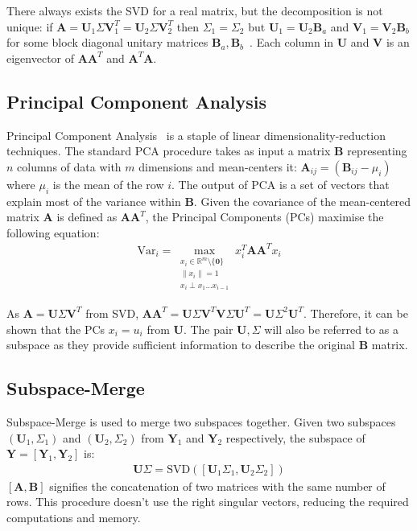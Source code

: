 There always exists the SVD for a real matrix, but the decomposition is not
unique: if $\mathbf{A} = \mathbf{U}_1\Sigma\mathbf{V}_1^T =
\mathbf{U}_2\Sigma\mathbf{V}_2^T$ then $\Sigma_1 = \Sigma_2$ but $\mathbf{U}_1 =
\mathbf{U}_2\mathbf{B}_a$ and $\mathbf{V}_1 = \mathbf{V}_2\mathbf{B}_b$ for some
block diagonal unitary matrices $\mathbf{B}_a,
\mathbf{B}_b$~\cite{eftekhari2019moses, Strang2009}. Each column in
$\mathbf{U}$ and $\mathbf{V}$ is an eigenvector of $\mathbf{AA}^T$ and
$\mathbf{A}^T\mathbf{A}$.

\subsection{Principal Component Analysis}
Principal Component Analysis~\cite{} is a staple of linear
dimensionality-reduction techniques. The standard PCA procedure takes as input a
matrix $\mathbf{B}$ representing $n$ columns of data with $m$ dimensions and
mean-centers it: $\mathbf{A}_{ij} = (\mathbf{B}_{ij} - \mu_i)$ where $\mu_i$ is
the mean of the row $i$. The output of PCA is a set of vectors that explain most
of the variance within $\mathbf{B}$. Given the covariance of the mean-centered
matrix $\mathbf{A}$ is defined as $\mathbf{AA}^T$, the Principal Components
(PCs) maximise the following equation:
\begin{align}
\text{Var}_i = \max_{\substack{x_i \in \mathbb{R}^m \setminus \{\mathbf{0}\} \\
    \|x_i\|=1 \\ x_i \perp x_1 \dots x_{i-1}}} x_i^T \mathbf{A} \mathbf{A}^T x_i
\end{align}

As $\mathbf{A} = \mathbf{U}\Sigma\mathbf{V}^T$ from SVD,
$\mathbf{AA}^T = \mathbf{U}\Sigma\mathbf{V}^T\mathbf{V}\Sigma\mathbf{U}^T =
\mathbf{U}\Sigma^2\mathbf{U}^T$. Therefore, it can be shown that the PCs
$x_i = u_i$ from $\mathbf{U}$. The pair $\mathbf{U}, \Sigma$ will also be
referred to as a subspace as they provide sufficient information to describe the
original $\mathbf{B}$ matrix.

\subsection{Subspace-Merge}
Subspace-Merge is used to merge two subspaces together. Given two subspaces
$(\mathbf{U}_1, \Sigma_1)$ and $(\mathbf{U}_2, \Sigma_2)$ from $\mathbf{Y}_1$ and
$\mathbf{Y}_2$ respectively, the subspace of $\mathbf{Y} = [\mathbf{Y}_1,
\mathbf{Y}_2]$ is:
\begin{align}
    \mathbf{U}\Sigma = \text{SVD}([\mathbf{U}_1\Sigma_1, \mathbf{U}_2\Sigma_2])
\end{align}
$[\mathbf{A}, \mathbf{B}]$ signifies the concatenation of two matrices with the
same number of rows. This procedure doesn't use the right singular vectors,
reducing the required computations and memory.

